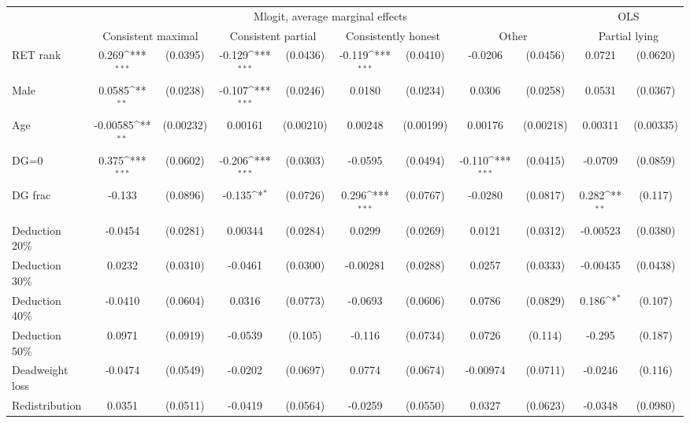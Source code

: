 \def\sym#1{\ifmmode^{#1}\else\(^{#1}\)\fi}
\begin{tabular}{l|cccccccc|cc}
\hline\hline
&\multicolumn{8}{c|}{Mlogit, average marginal effects }&\multicolumn{2}{c}{OLS}\\
                &\multicolumn{2}{c}{Consistent maximal}&\multicolumn{2}{c}{Consistent partial}&\multicolumn{2}{c}{Consistently honest}&\multicolumn{2}{c}{Other}   &\multicolumn{2}{|c}{Partial lying}\\
\hline
RET rank        &    0.269\sym{***}& (0.0395)&   -0.129\sym{***}& (0.0436)&   -0.119\sym{***}& (0.0410)&  -0.0206         & (0.0456)&   0.0721         & (0.0620)\\
Male            &   0.0585\sym{**} & (0.0238)&   -0.107\sym{***}& (0.0246)&   0.0180         & (0.0234)&   0.0306         & (0.0258)&   0.0531         & (0.0367)\\
Age             & -0.00585\sym{**} &(0.00232)&  0.00161         &(0.00210)&  0.00248         &(0.00199)&  0.00176         &(0.00218)&  0.00311         &(0.00335)\\
DG=0          &    0.375\sym{***}& (0.0602)&   -0.206\sym{***}& (0.0303)&  -0.0595         & (0.0494)&   -0.110\sym{***}& (0.0415)&  -0.0709         & (0.0859)\\
DG frac         &   -0.133         & (0.0896)&   -0.135\sym{*}  & (0.0726)&    0.296\sym{***}& (0.0767)&  -0.0280         & (0.0817)&    0.282\sym{**} &  (0.117)\\
Deduction 20\%&  -0.0454         & (0.0281)&  0.00344         & (0.0284)&   0.0299         & (0.0269)&   0.0121         & (0.0312)& -0.00523         & (0.0380)\\
Deduction 30\%&   0.0232         & (0.0310)&  -0.0461         & (0.0300)& -0.00281         & (0.0288)&   0.0257         & (0.0333)& -0.00435         & (0.0438)\\
Deduction 40\%&  -0.0410         & (0.0604)&   0.0316         & (0.0773)&  -0.0693         & (0.0606)&   0.0786         & (0.0829)&    0.186\sym{*}  &  (0.107)\\
Deduction 50\%&   0.0971         & (0.0919)&  -0.0539         &  (0.105)&   -0.116         & (0.0734)&   0.0726         &  (0.114)&   -0.295         &  (0.187)\\
Deadweight loss&  -0.0474         & (0.0549)&  -0.0202         & (0.0697)&   0.0774         & (0.0674)& -0.00974         & (0.0711)&  -0.0246         &  (0.116)\\
Redistribution&   0.0351         & (0.0511)&  -0.0419         & (0.0564)&  -0.0259         & (0.0550)&   0.0327         & (0.0623)&  -0.0348         & (0.0980)\\

\end{tabular}
